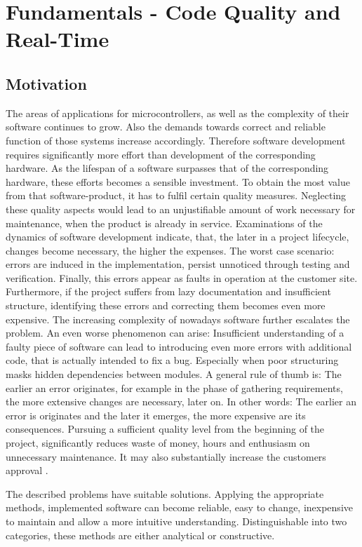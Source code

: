 \chapter{Fundamentals - Code Quality and Real-Time}
\label{cha:Fundamentals}
	\section{Motivation}
	The areas of applications for microcontrollers, as well as the complexity of their software continues to grow. Also the demands towards correct and reliable function of those systems increase accordingly. Therefore software development requires significantly more effort than development of the corresponding hardware. As the lifespan of a software surpasses that of the corresponding hardware, these efforts becomes a sensible investment. To obtain the most value from that software-product, it has to fulfil certain quality measures. Neglecting these quality aspects would lead to an unjustifiable amount of work necessary for maintenance, when the product is already in service. Examinations of the dynamics of software development indicate, that, the later in a project lifecycle, changes become necessary, the higher the expenses. The worst case scenario: errors are induced in the implementation, persist unnoticed through testing and verification. Finally, this errors appear as faults in operation at the customer site. Furthermore, if the project suffers from lazy documentation and insufficient structure, identifying these errors and correcting them becomes even more expensive. The increasing complexity of nowadays software further escalates the problem. An even worse phenomenon can arise: Insufficient understanding of a faulty piece of software can lead to introducing even more errors with additional code, that is actually intended to fix a bug. Especially when poor structuring masks hidden dependencies between modules. A general rule of thumb is: The earlier an error originates, for example in the phase of gathering requirements, the more extensive changes are necessary, later on. In other words: The earlier an error is originates and the later it emerges, the more expensive are its consequences. Pursuing a sufficient quality level from the beginning of the project, significantly reduces waste of money, hours and enthusiasm on unnecessary maintenance. It may also substantially increase the customers approval \cite{Luo2001SoftwareTT}. %

	The described problems have suitable solutions. Applying the appropriate methods, implemented software can become reliable, easy to change, inexpensive to maintain and allow a more intuitive understanding. Distinguishable into two categories, these methods are either analytical or constructive. \\
	
